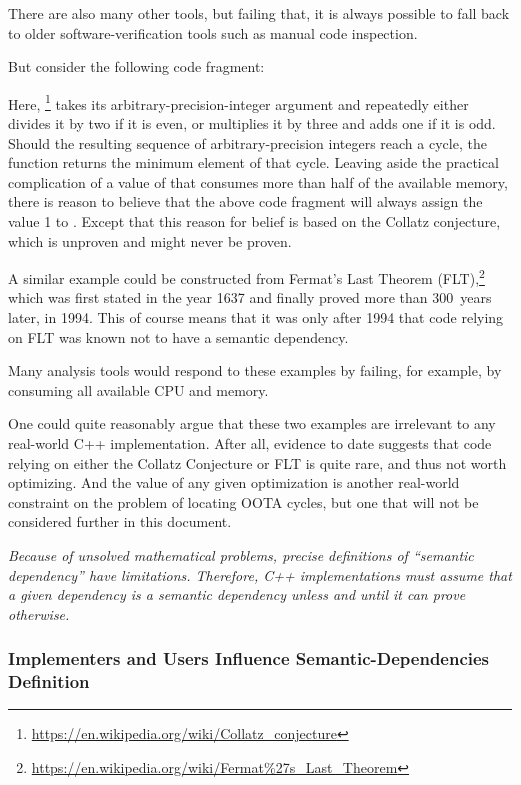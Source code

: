 \documentclass[10]{article}
\begin{document}
There are also many other tools, but failing that, it is always possible
to fall back to older software-verification tools such as manual
code inspection.

But consider the following code fragment:

\begin{quote}
\end{quote}

Here, \footnote{
	\url{https://en.wikipedia.org/wiki/Collatz_conjecture}}
takes its arbitrary-precision-integer argument and repeatedly either
divides it by two if it is even, or multiplies it by three and adds one
if it is odd.
Should the resulting sequence of arbitrary-precision integers reach
a cycle, the function returns the minimum element of that cycle.
Leaving aside the practical complication of a value of  that
consumes more than half of the available memory, there is reason to
believe that the above code fragment will always assign the value 1 to
.
Except that this reason for belief is based on the Collatz conjecture,
which is unproven and might never be proven.

A similar example could be constructed from Fermat's Last Theorem
(FLT),\footnote{
\url{https://en.wikipedia.org/wiki/Fermat\%27s_Last_Theorem}}
which was first stated in the year 1637 and finally proved more than
300~years later, in 1994.
This of course means that it was only after 1994 that code relying on
FLT was known not to have a semantic dependency.

Many analysis tools would respond to these examples by failing, for example,
by consuming all available CPU and memory.

One could quite reasonably argue that these two examples are irrelevant
to any real-world C++ implementation.
After all, evidence to date suggests that code relying on either the
Collatz Conjecture or FLT is quite rare, and thus not worth optimizing.
And the value of any given optimization is another real-world constraint
on the problem of locating OOTA cycles, but one that will not be considered
further in this document.

\emph{Because of unsolved mathematical problems, precise definitions of
``semantic dependency'' have limitations.
Therefore, C++ implementations must assume that a given dependency is
a semantic dependency unless and until it can prove otherwise.}

\subsubsection{Implementers and Users Influence Semantic-Dependencies Definition}
\label{sec:Implementers and Users Influence Semantic-Dependencies Definition}
\end{document}

